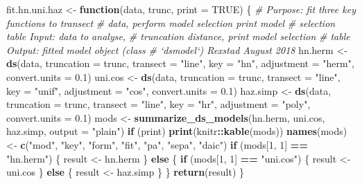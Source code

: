 \documentclass[10pt,a4paper]{tufte-handout}
\newenvironment{Shaded}{\begin{snugshade}}{\end{snugshade}}
\newcommand{\CommentTok}[1]{\textcolor[rgb]{0.56,0.35,0.01}{\textit{#1}}}
\newcommand{\ControlFlowTok}[1]{\textcolor[rgb]{0.13,0.29,0.53}{\textbf{#1}}}
\newcommand{\DataTypeTok}[1]{\textcolor[rgb]{0.13,0.29,0.53}{#1}}
\newcommand{\DecValTok}[1]{\textcolor[rgb]{0.00,0.00,0.81}{#1}}
\newcommand{\FloatTok}[1]{\textcolor[rgb]{0.00,0.00,0.81}{#1}}
\newcommand{\KeywordTok}[1]{\textcolor[rgb]{0.13,0.29,0.53}{\textbf{#1}}}
\newcommand{\NormalTok}[1]{#1}
\newcommand{\OperatorTok}[1]{\textcolor[rgb]{0.81,0.36,0.00}{\textbf{#1}}}
\newcommand{\OtherTok}[1]{\textcolor[rgb]{0.56,0.35,0.01}{#1}}
\newcommand{\StringTok}[1]{\textcolor[rgb]{0.31,0.60,0.02}{#1}}
\begin{document}
\begin{Shaded}
\begin{Highlighting}[]
\NormalTok{fit.hn.uni.haz <-}\StringTok{ }\ControlFlowTok{function}\NormalTok{(data, trunc, }\DataTypeTok{print =} \OtherTok{TRUE}\NormalTok{) \{}
    \CommentTok{# Purpose: fit three key functions to transect}
    \CommentTok{# data, perform model selection print model}
    \CommentTok{# selection table Input: data to analyse,}
    \CommentTok{# truncation distance, print model selection}
    \CommentTok{# table Output: fitted model object (class}
    \CommentTok{# `dsmodel`) Rexstad August 2018}
\NormalTok{    hn.herm <-}\StringTok{ }\KeywordTok{ds}\NormalTok{(data, }\DataTypeTok{truncation =}\NormalTok{ trunc, }\DataTypeTok{transect =} \StringTok{"line"}\NormalTok{, }
        \DataTypeTok{key =} \StringTok{"hn"}\NormalTok{, }\DataTypeTok{adjustment =} \StringTok{"herm"}\NormalTok{, }\DataTypeTok{convert.units =} \FloatTok{0.1}\NormalTok{)}
\NormalTok{    uni.cos <-}\StringTok{ }\KeywordTok{ds}\NormalTok{(data, }\DataTypeTok{truncation =}\NormalTok{ trunc, }\DataTypeTok{transect =} \StringTok{"line"}\NormalTok{, }
        \DataTypeTok{key =} \StringTok{"unif"}\NormalTok{, }\DataTypeTok{adjustment =} \StringTok{"cos"}\NormalTok{, }\DataTypeTok{convert.units =} \FloatTok{0.1}\NormalTok{)}
\NormalTok{    haz.simp <-}\StringTok{ }\KeywordTok{ds}\NormalTok{(data, }\DataTypeTok{truncation =}\NormalTok{ trunc, }\DataTypeTok{transect =} \StringTok{"line"}\NormalTok{, }
        \DataTypeTok{key =} \StringTok{"hr"}\NormalTok{, }\DataTypeTok{adjustment =} \StringTok{"poly"}\NormalTok{, }\DataTypeTok{convert.units =} \FloatTok{0.1}\NormalTok{)}
\NormalTok{    mods <-}\StringTok{ }\KeywordTok{summarize_ds_models}\NormalTok{(hn.herm, uni.cos, }
\NormalTok{        haz.simp, }\DataTypeTok{output =} \StringTok{"plain"}\NormalTok{)}
    \ControlFlowTok{if}\NormalTok{ (print) }
        \KeywordTok{print}\NormalTok{(knitr}\OperatorTok{::}\KeywordTok{kable}\NormalTok{(mods))}
    \KeywordTok{names}\NormalTok{(mods) <-}\StringTok{ }\KeywordTok{c}\NormalTok{(}\StringTok{"mod"}\NormalTok{, }\StringTok{"key"}\NormalTok{, }\StringTok{"form"}\NormalTok{, }\StringTok{"fit"}\NormalTok{, }
        \StringTok{"pa"}\NormalTok{, }\StringTok{"sepa"}\NormalTok{, }\StringTok{"daic"}\NormalTok{)}
    \ControlFlowTok{if}\NormalTok{ (mods[}\DecValTok{1}\NormalTok{, }\DecValTok{1}\NormalTok{] }\OperatorTok{==}\StringTok{ "hn.herm"}\NormalTok{) \{}
\NormalTok{        result <-}\StringTok{ }\NormalTok{hn.herm}
\NormalTok{    \} }\ControlFlowTok{else}\NormalTok{ \{}
        \ControlFlowTok{if}\NormalTok{ (mods[}\DecValTok{1}\NormalTok{, }\DecValTok{1}\NormalTok{] }\OperatorTok{==}\StringTok{ "uni.cos"}\NormalTok{) \{}
\NormalTok{            result <-}\StringTok{ }\NormalTok{uni.cos}
\NormalTok{        \} }\ControlFlowTok{else}\NormalTok{ \{}
\NormalTok{            result <-}\StringTok{ }\NormalTok{haz.simp}
\NormalTok{        \}}
\NormalTok{    \}}
    \KeywordTok{return}\NormalTok{(result)}
\NormalTok{\}}
\end{Highlighting}
\end{Shaded}
\end{document}
